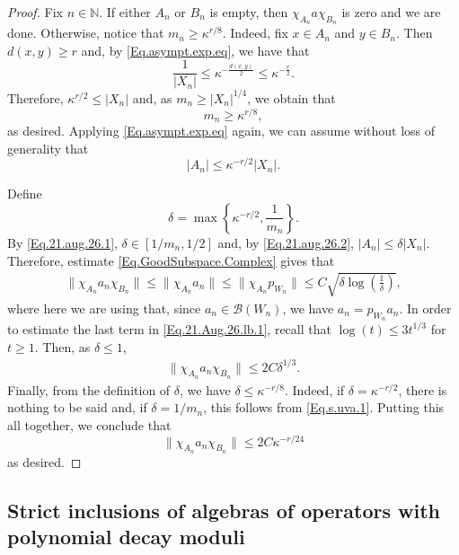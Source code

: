 \documentclass[11pt]{amsart}
\newcommand{\N}{\mathbb{N}}
\newcommand{\cB}{\mathcal{B}}
\numberwithin{equation}{section}
\theoremstyle{definition}
\theoremstyle{remark}
\begin{document}
\begin{proof}
 Fix $n\in\N$. If either $A_n$ or $B_n$ is empty, then $\chi_{A_n}a\chi_{B_n}$ is zero and we are done. Otherwise, notice that $m_n\geq \kappa^{r/8}$. Indeed, fix $x\in A_n$ and $y\in B_n$. Then $d(x,y)\geq r$ and, by  \eqref{Eq.asympt.exp.eq}, we have that
 \[\frac{1}{|X_n|}\leq \kappa^{-\frac{d(x,y)}{2}}\leq \kappa^{-\frac{r}{2}}.\]
 Therefore, $\kappa^{r/2}\leq |X_n|$ and, as $m_n\geq |X_n|^{1/4}$, we obtain that \begin{equation}\label{Eq.s.uva.1}
 m_n\geq  \kappa^{r/8},
 \end{equation}
 as desired. Applying \eqref{Eq.asympt.exp.eq} again, we can assume without loss of generality that  \begin{equation}\label{Eq.21.aug.26.2}|A_n|\leq \kappa^{-r/2}|X_n|.\end{equation}

Define
 \[\delta=\max\left\{\kappa^{-r/2},\frac{1}{m_n}\right\}.\] By \eqref{Eq.21.aug.26.1},   $\delta\in[1/m_n,1/2]$ and, by \eqref{Eq.21.aug.26.2},  $|A_n|\leq \delta|X_n|$. Therefore, estimate \eqref{Eq.GoodSubspace.Complex} gives that
\begin{align}\label{Eq.21.Aug.26.lb.1}
\|\chi_{A_n}a_n\chi_{B_n}\|\leq \|\chi_{A_n}a_n\|\leq \|\chi_{A_n}p_{W_n}\| \leq C\sqrt{\delta\log\left(\frac1\delta\right)},
\end{align}
where here we are using that, since $a_n\in \cB(W_n)$, we have  $a_n=p_{W_n}a_n$. In order to estimate the last term in \eqref{Eq.21.Aug.26.lb.1}, recall that $\log(t)\leq 3t^{1/3}$ for $t\geq 1$. Then, as $\delta\leq 1$,
\begin{align}\label{Eq.21.Aug.26.lb.2}
\|\chi_{A_n}a_n\chi_{B_n}\|
\leq 2C\delta^{1/3}.\end{align}
Finally, from the definition of $\delta$, we have $\delta\leq  \kappa^{-r/8}$. Indeed, if   $\delta=\kappa^{-r/2}$, there is nothing to be said and, if $\delta=1/m_n$, this follows from  \eqref{Eq.s.uva.1}. Putting this all together, we conclude that
\[\|\chi_{A_n}a_n\chi_{B_n}\|\leq 2C\kappa^{-r/24}\]
as desired.\end{proof}











\subsection{Strict inclusions of algebras of operators with polynomial decay moduli}
\end{document}
